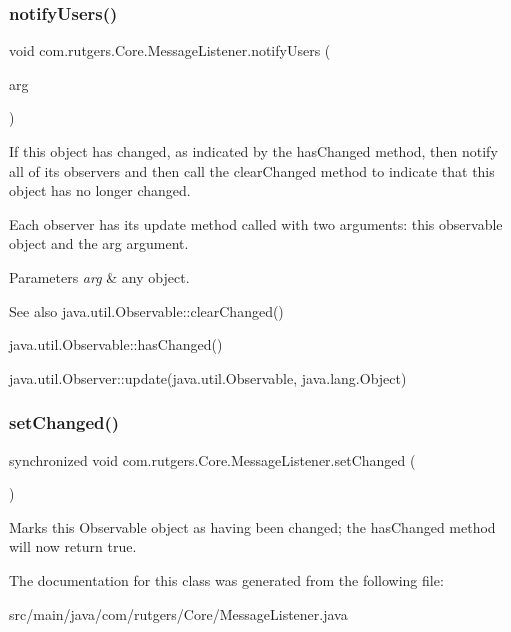 \subsubsection{\texorpdfstring{notify\+Users()}{notifyUsers()}\hspace{0.1cm}{\footnotesize\ttfamily [2/2]}}
{\footnotesize\ttfamily void com.\+rutgers.\+Core.\+Message\+Listener.\+notify\+Users (\begin{DoxyParamCaption}\item[{Message.\+A\+R\+Message}]{arg }\end{DoxyParamCaption})}

If this object has changed, as indicated by the {\ttfamily has\+Changed} method, then notify all of its observers and then call the {\ttfamily clear\+Changed} method to indicate that this object has no longer changed. 

Each observer has its {\ttfamily update} method called with two arguments\+: this observable object and the {\ttfamily arg} argument.


\begin{DoxyParams}{Parameters}
{\em arg} & any object. \\
\hline
\end{DoxyParams}
\begin{DoxySeeAlso}{See also}
java.\+util.\+Observable\+::clear\+Changed() 

java.\+util.\+Observable\+::has\+Changed() 

java.\+util.\+Observer\+::update(java.\+util.\+Observable, java.\+lang.\+Object) 
\end{DoxySeeAlso}
\mbox{\label{classcom_1_1rutgers_1_1Core_1_1MessageListener_a98f9b666ae0b37f818ae53024a10ddad}} 
\subsubsection{\texorpdfstring{set\+Changed()}{setChanged()}}
{\footnotesize\ttfamily synchronized void com.\+rutgers.\+Core.\+Message\+Listener.\+set\+Changed (\begin{DoxyParamCaption}{ }\end{DoxyParamCaption})\hspace{0.3cm}{\ttfamily [protected]}}

Marks this {\ttfamily Observable} object as having been changed; the {\ttfamily has\+Changed} method will now return {\ttfamily true}. 

The documentation for this class was generated from the following file\+:\begin{DoxyCompactItemize}
\item 
src/main/java/com/rutgers/\+Core/Message\+Listener.\+java\end{DoxyCompactItemize}
